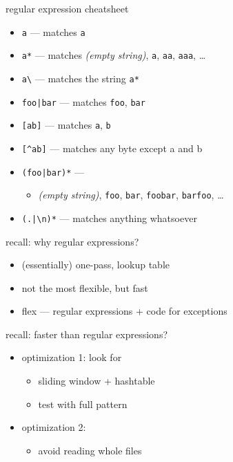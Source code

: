 \begin{frame}[fragile,label=reCheat]{regular expression cheatsheet}
    \begin{itemize}
    \item {\tt a} --- matches {\tt a}
    \item {\tt a*} --- matches \textit{(empty string)}, {\tt a}, {\tt aa}, {\tt aaa}, \ldots
    \item {\tt a\textbackslash\*} --- matches the string {\tt a*}
    \item {\tt foo|bar} --- matches {\tt foo}, {\tt bar}
    \item {\tt [ab]} --- matches {\tt a}, {\tt b}
    \item \verb|[^ab]| --- matches any byte except a and b
    \item {\tt (foo|bar)*} ---
        \begin{itemize}
        \item \textit{(empty string)}, {\tt foo}, {\tt bar}, {\tt foobar}, {\tt barfoo}, \ldots
        \end{itemize}
    \item {\tt (.|\textbackslash{}n)*} --- matches anything whatsoever
    \end{itemize}
\end{frame}

\begin{frame}{recall: why regular expressions?}
    \begin{itemize}
    \item (essentially) one-pass, lookup table
    \item not the most flexible, but fast
    \vspace{.5cm}
    \item flex --- regular expressions + code for exceptions
    \end{itemize}
\end{frame}

\begin{frame}{recall: faster than regular expressions?}
    \begin{itemize}
    \item optimization 1: look for 
        \begin{itemize}
        \item sliding window + hashtable
        \item test with full pattern
        \end{itemize}
    \item optimization 2: 
        \begin{itemize}
        \item avoid reading whole files
        \end{itemize}
    \end{itemize}
\end{frame}

